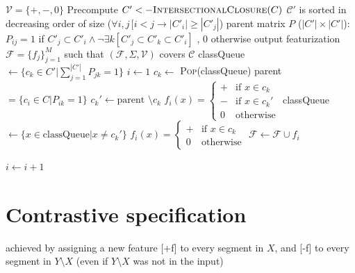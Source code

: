 \documentclass[11pt, oneside]{article}   	%
\begin{document}
\vspace{\baselineskip} \noindent \begin{algorithmic}
	\REQUIRE $\mathcal V = \{ +, -, 0 \}$
	\REQUIRE Precompute $C' <- \textsc{IntersectionalClosure}(C)$
	\REQUIRE $\mathcal C'$ is sorted in decreasing order of size ($\forall i, j \, [i < j \rightarrow |C'_i| \geq |C'_j|$)
	\REQUIRE parent matrix $P$ ($|C'| \times |C'|$): $P_{ij} = 1$ if $C'_j \subset C'_i \land \neg \exists k [C'_j \subset C'_k \subset C'_i]$ , $0$ otherwise
	\ENSURE output featurization $\mathcal F = \{ f_j \}_{j=1}^M$ such that $(\mathcal F, \Sigma, \mathcal V)$ covers $\mathcal C$
	\STATE classQueue $\leftarrow \{c_k \in C' | \sum_{j=1}^{|C'|}P_{jk} = 1 \}$
	\STATE $i \leftarrow 1$
	\STATE
	\STATE $c_k \leftarrow$ \textsc{Pop}(classQueue)
	\STATE parent $ = \{c_i \in C | P_{ik} = 1\}$
	\STATE $c_k' \leftarrow \mbox{parent } \setminus c_k$
	\STATE $f_i(x) = \begin{cases}
	+ & \mbox{if } x \in c_k \\
	- & \mbox{if } x \in c_k' \\
	0 & \mbox{otherwise}
	\end{cases} $
	\STATE classQueue $\leftarrow \{x \in \mbox{classQueue} | x \not= c_k' \}$
	\ELSE
	\STATE $f_i(x) = \begin{cases}
	+ & \mbox{if } x \in c_k \\
	0 & \mbox{otherwise}
	\end{cases} $
	\ENDIF
	\STATE $\mathcal F \leftarrow \mathcal F \cup f_i$
	
	\STATE $i \leftarrow i + 1$
	\ENDWHILE
\end{algorithmic}

\section{Contrastive specification}
achieved by assigning a new feature [+f] to every segment in $X$, and [-f] to every segment in $Y \setminus X$ (even if $Y \setminus X$ was not in the input)
\end{document}
